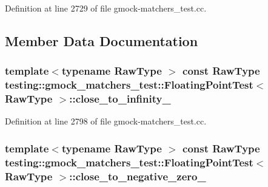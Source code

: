 Definition at line 2729 of file gmock-\/matchers\+\_\+test.\+cc.



\subsection{Member Data Documentation}
\subsubsection[{\texorpdfstring{close\+\_\+to\+\_\+infinity\+\_\+}{close_to_infinity_}}]{\setlength{\rightskip}{0pt plus 5cm}template$<$typename Raw\+Type $>$ const Raw\+Type {\bf testing\+::gmock\+\_\+matchers\+\_\+test\+::\+Floating\+Point\+Test}$<$ Raw\+Type $>$\+::close\+\_\+to\+\_\+infinity\+\_\+\hspace{0.3cm}{\ttfamily [protected]}}\hypertarget{classtesting_1_1gmock__matchers__test_1_1_floating_point_test_a6fc8ac2030f4883e1c84da3a21bbb7c3}{}\label{classtesting_1_1gmock__matchers__test_1_1_floating_point_test_a6fc8ac2030f4883e1c84da3a21bbb7c3}


Definition at line 2798 of file gmock-\/matchers\+\_\+test.\+cc.

\subsubsection[{\texorpdfstring{close\+\_\+to\+\_\+negative\+\_\+zero\+\_\+}{close_to_negative_zero_}}]{\setlength{\rightskip}{0pt plus 5cm}template$<$typename Raw\+Type $>$ const Raw\+Type {\bf testing\+::gmock\+\_\+matchers\+\_\+test\+::\+Floating\+Point\+Test}$<$ Raw\+Type $>$\+::close\+\_\+to\+\_\+negative\+\_\+zero\+\_\+\hspace{0.3cm}{\ttfamily [protected]}}\hypertarget{classtesting_1_1gmock__matchers__test_1_1_floating_point_test_a641f5e223c25b6d6fb108b322acaa39d}{}\label{classtesting_1_1gmock__matchers__test_1_1_floating_point_test_a641f5e223c25b6d6fb108b322acaa39d}


